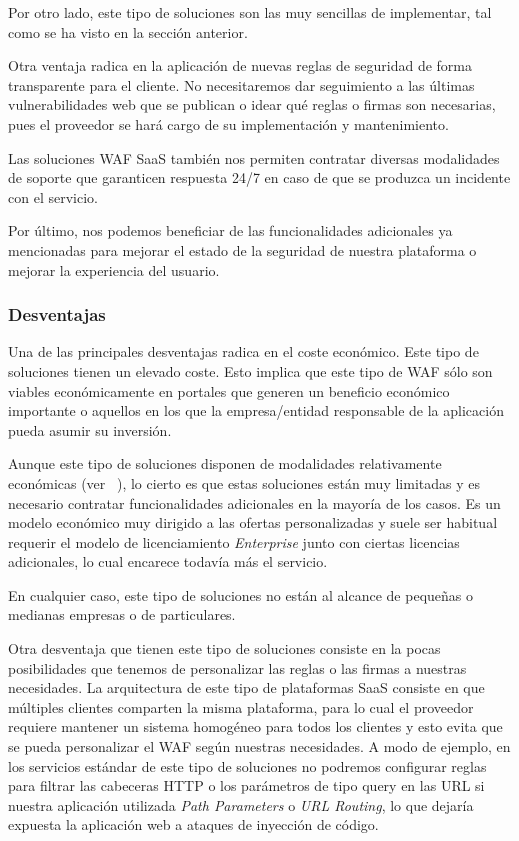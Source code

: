 \par Por otro lado, este tipo de soluciones son las muy sencillas de implementar, tal como se ha visto en la sección anterior.
\par Otra ventaja radica en la aplicación de nuevas reglas de seguridad de forma transparente para el cliente. No necesitaremos dar seguimiento
a las últimas vulnerabilidades web que se publican o idear qué reglas o firmas son necesarias, pues el proveedor se hará cargo de su
implementación y mantenimiento.
\par Las soluciones WAF SaaS también nos permiten contratar diversas modalidades de soporte que garanticen respuesta 24/7 en caso de que se
produzca un incidente con el servicio.
\par Por último, nos podemos beneficiar de las funcionalidades adicionales ya mencionadas para mejorar el estado de la seguridad de nuestra
plataforma o mejorar la experiencia del usuario.


\subsubsection{Desventajas}
\par Una de las principales desventajas radica en el coste económico. Este tipo de soluciones tienen un elevado coste. Esto implica que este tipo de WAF sólo son viables económicamente en portales que generen un beneficio económico importante o aquellos en los que la empresa/entidad responsable de la aplicación pueda asumir su inversión.
\par Aunque este tipo de soluciones disponen de modalidades relativamente económicas (ver ~), lo cierto es que estas soluciones
están muy limitadas y es necesario contratar funcionalidades adicionales en la mayoría de los casos. Es un modelo económico muy dirigido a las
ofertas personalizadas y suele ser habitual requerir el modelo de licenciamiento {\em Enterprise} junto con ciertas licencias adicionales, lo
cual encarece todavía más el servicio.
\par En cualquier caso, este tipo de soluciones no están al alcance de pequeñas o medianas empresas o de particulares.

\par Otra desventaja que tienen este tipo de soluciones consiste en la pocas posibilidades que tenemos de personalizar las reglas o las firmas
a nuestras necesidades. La arquitectura de este tipo de plataformas SaaS consiste en que múltiples clientes comparten la misma plataforma, para
lo cual el proveedor requiere mantener un sistema homogéneo para todos los clientes y esto evita que se pueda personalizar el WAF según
nuestras necesidades. A modo de ejemplo, en los servicios estándar de este tipo de soluciones no podremos configurar reglas para filtrar las
cabeceras HTTP o los parámetros de tipo query en las URL si nuestra aplicación utilizada {\em Path Parameters} o {\em URL Routing}, lo que
dejaría expuesta la aplicación web a ataques de inyección de código.


